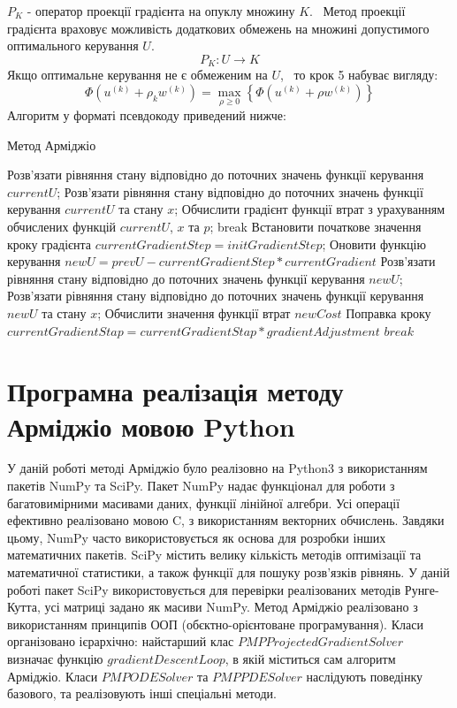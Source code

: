 \documentclass[a4paper,12pt]{extreport}
\begin{document}
$P_K$ - оператор проекції градієнта на опуклу множину $K$.  Метод проекції градієнта враховує можливість додаткових обмежень на множині допустимого оптимального керування $U$. $$
P_K: U \rightarrow K
$$
    Якщо оптимальне керування не є обмеженим на $U$,  то крок 5 набуває вигляду:
$$
    \Phi\left(u^{(k)}+\rho_k w^{(k)}\right)=\max _{\rho \geq 0}\left\{\Phi\left(u^{(k)}+\rho w^{(k)}\right)\right\}
$$
Алгоритм у форматі псевдокоду приведений нижче:
\begin{algorithm}[H]
	\caption*{Метод Арміджіо} 
	\begin{algorithmic}[1]
            \State Розв'язати рівняння стану відповідно до поточних значень функції керування $currentU$;
            \State Розв'язати рівняння стану відповідно до поточних значень функції керування $currentU$ та стану $x$;
            \State Обчислити градієнт функції втрат з урахуванням обчислених функцій $currentU$, $x$ та $p$;
                \State break
            \EndIf
            \State Встановити початкове значення кроку градієнта $currentGradientStep=initGradientStep$;
                \State Оновити функцію керування $ newU = prevU - currentGradientStep * currentGradient $
                \State Розв'язати рівняння стану відповідно до поточних значень функції керування $newU$;
                \State Розв'язати рівняння стану відповідно до поточних значень функції керування $newU$ та стану $x$;
                \State Обчислити значення функції втрат $ newCost $
                    \State Поправка кроку $currentGradientStap = currentGradientStap * gradientAdjustment $
                \Else
                    \State $ break $
                \EndIf
			\EndFor
        \EndWhile
	\end{algorithmic} 
\end{algorithm}
\section{Програмна реалізація методу Арміджіо мовою Python}
У даній роботі методі Арміджіо було реалізовно на Python3 з використанням пакетів NumPy та SciPy. Пакет NumPy надає 
функціонал для роботи з багатовимірними масивами даних, функції лінійної алгебри. Усі операції ефективно реалізовано 
мовою C, з використанням векторних обчислень. Завдяки цьому, NumPy часто використовується як основа для розробки інших 
математичних пакетів. SciPy містить велику кількість методів оптимізації та математичної статистики, а також функції для пошуку 
розв'язків рівнянь. У даній роботі пакет SciPy використовується для перевірки реалізованих методів Рунге-Кутта, усі матриці 
задано як масиви NumPy. 
Метод Арміджіо реалізовано з використанням принципів ООП (обєктно-орієнтоване програмування). Класи організовано ієрархічно:
найстарший клас $PMPProjectedGradientSolver$ визначає функцію $ gradientDescentLoop $, в якій міститься сам алгоритм Арміджіо.
Класи $ PMPODESolver $ та $ PMPPDESolver $ наслідують поведінку базового, та реалізовують інші спеціальні методи.
\end{document}
